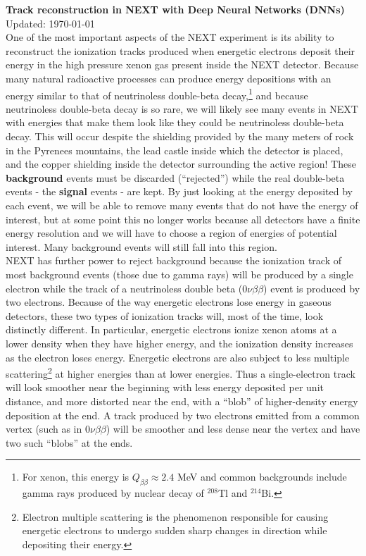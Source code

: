 \documentclass[10pt]{article}
\begin{document}
{\noindent\Large{\textbf{Track reconstruction in NEXT with Deep Neural Networks (DNNs)}}}\\
Updated: \today\\ %

\noindent One of the most important aspects of the NEXT experiment is its ability to reconstruct the ionization tracks produced when energetic electrons deposit their
energy in the high pressure xenon gas present inside the NEXT detector.  Because many natural radioactive processes can produce energy depositions with an energy similar 
to that of neutrinoless double-beta decay,\footnote{For xenon, this energy is $Q_{\beta\beta} \approx 2.4$ MeV and common backgrounds include gamma rays produced by nuclear
decay of $^{208}$Tl and $^{214}$Bi.} and because neutrinoless double-beta decay is so rare, we will likely see many events in NEXT with energies that make them look like they could be
neutrinoless double-beta decay.  This will occur despite the shielding provided by the many meters of rock in the Pyrenees mountains, the lead castle inside which the detector is placed, and
the copper shielding inside the detector surrounding the active region!  These \textbf{background} events must be discarded (``rejected'') while the real double-beta events - the \textbf{signal} 
events - are kept.  By just looking at the energy deposited by each event, we will be able to remove many events that do not have the energy of interest, but at some point this no longer works
because all detectors have a finite energy resolution and we will have to choose a region of energies of potential interest.  Many background events will still fall into this region.\\

\noindent NEXT has further power to reject background because the ionization track of most background events (those due to gamma rays) will be produced by a single electron while the
track of a neutrinoless double beta ($0\nu\beta\beta$) event is produced by two electrons.  Because of the way energetic electrons lose energy in gaseous detectors, these two types of
ionization tracks will, most of the time, look distinctly different.  In particular, energetic electrons ionize xenon atoms at a lower density when they have higher energy, and the ionization density
increases as the electron loses energy.  Energetic electrons are also subject to less multiple scattering\footnote{Electron multiple scattering is the phenomenon responsible for
causing energetic electrons to undergo sudden sharp changes in direction while depositing their energy.} at higher energies than at lower energies.  Thus a single-electron track will look smoother
near the beginning with less energy deposited per unit distance, and more distorted near the end, with a ``blob'' of higher-density energy deposition at the end.  A track produced by two electrons
emitted from a common vertex (such as in $0\nu\beta\beta$) will be smoother and less dense near the vertex and have two such ``blobs'' at the ends.\\
\end{document}
